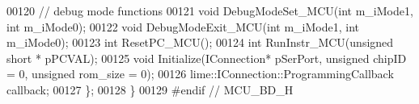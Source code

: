 \begin{DoxyCode}
00120         \textcolor{comment}{// debug mode functions}
00121         \textcolor{keywordtype}{void} DebugModeSet_MCU(\textcolor{keywordtype}{int} m\_iMode1, \textcolor{keywordtype}{int} m\_iMode0);
00122         \textcolor{keywordtype}{void} DebugModeExit_MCU(\textcolor{keywordtype}{int} m\_iMode1, \textcolor{keywordtype}{int} m\_iMode0);
00123         \textcolor{keywordtype}{int} ResetPC_MCU();
00124         \textcolor{keywordtype}{int} RunInstr_MCU(\textcolor{keywordtype}{unsigned} \textcolor{keywordtype}{short} * pPCVAL);
00125         \textcolor{keywordtype}{void} Initialize(IConnection* pSerPort, \textcolor{keywordtype}{unsigned} chipID = 0, \textcolor{keywordtype}{unsigned} rom\_size = 0);
00126         lime::IConnection::ProgrammingCallback callback;
00127 \};
00128 \}
00129 \textcolor{preprocessor}{#endif // MCU\_BD\_H}
\end{DoxyCode}
